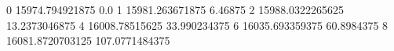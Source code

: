 0 15974.794921875 0.0
1 15981.263671875 6.46875
2 15988.0322265625 13.2373046875
4 16008.78515625 33.990234375
6 16035.693359375 60.8984375
8 16081.8720703125 107.0771484375
